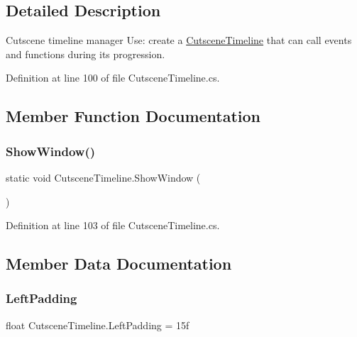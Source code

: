 \subsection{Detailed Description}
Cutscene timeline manager Use\+: create a \mbox{\hyperlink{class_cutscene_timeline}{Cutscene\+Timeline}} that can call events and functions during its progression. 



Definition at line 100 of file Cutscene\+Timeline.\+cs.



\subsection{Member Function Documentation}
\mbox{\label{class_cutscene_timeline_ab05d4b8d3e309ca03a33ef070135b69d}} 
\subsubsection{\texorpdfstring{Show\+Window()}{ShowWindow()}}
{\footnotesize\ttfamily static void Cutscene\+Timeline.\+Show\+Window (\begin{DoxyParamCaption}{ }\end{DoxyParamCaption})\hspace{0.3cm}{\ttfamily [static]}}



Definition at line 103 of file Cutscene\+Timeline.\+cs.



\subsection{Member Data Documentation}
\mbox{\label{class_cutscene_timeline_a580e21f1555fdd6913619ca2d3fd0308}} 
\subsubsection{\texorpdfstring{Left\+Padding}{LeftPadding}}
{\footnotesize\ttfamily float Cutscene\+Timeline.\+Left\+Padding = 15f\hspace{0.3cm}{\ttfamily [static]}}



